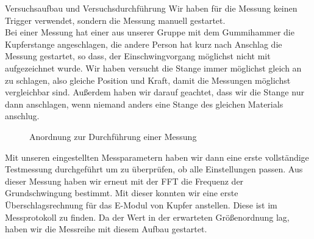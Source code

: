 \documentclass[twoside]{protokoll}
\begin{document}
\begin{aufgabe}{Versuchsaufbau und Versuchsdurchführung}
Wir haben für die Messung keinen Trigger verwendet, sondern die Messung manuell gestartet. \\


Bei einer Messung hat einer aus unserer Gruppe mit dem Gummihammer die Kupferstange angeschlagen, die andere Person hat kurz nach Anschlag die Messung gestartet, so dass, der Einschwingvorgang möglichst nicht mit aufgezeichnet wurde.
Wir haben versucht die Stange immer möglichst gleich an zu schlagen, also gleiche Position und Kraft, damit die Messungen möglichst vergleichbar sind.
Außerdem haben wir darauf geachtet, dass wir die Stange nur dann anschlagen, wenn niemand anders eine Stange des gleichen Materials anschlug.

\begin{figure}[H]
  \centering
  \hfill
  \caption{Anordnung zur Durchführung einer Messung}
\end{figure}



Mit unseren eingestellten Messparametern haben wir dann eine erste vollständige Testmessung durchgeführt um zu überprüfen, ob alle Einstellungen passen. Aus dieser Messung haben wir erneut mit der FFT die Frequenz der Grundschwingung bestimmt. Mit dieser konnten wir eine erste Überschlagsrechnung für das E-Modul von Kupfer anstellen.
Diese ist im Messprotokoll zu finden. Da der Wert in der erwarteten Größenordnung lag, haben wir die Messreihe mit diesem Aufbau gestartet. 



\end{aufgabe}
\end{document}
